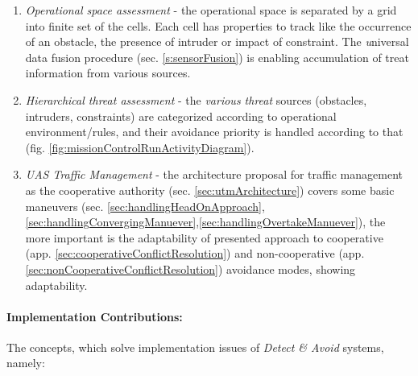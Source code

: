 \begin{enumerate}
    \item \emph{Operational space assessment} - the operational space is separated by a grid into finite set of the cells. Each cell has properties to track like the occurrence of an obstacle, the presence of intruder or impact of constraint. The \emph universal data fusion procedure (sec. \ref{s:sensorFusion}) is enabling accumulation of treat information from various sources.
    
    \item \emph{Hierarchical threat assessment} -  the \emph{various threat} sources (obstacles, intruders, constraints) are categorized according to operational environment/rules, and their avoidance priority is handled according to that (fig. \ref{fig:missionControlRunActivityDiagram}).
    
    \item \emph{UAS Traffic Management} - the architecture proposal for traffic management  as the cooperative authority (sec. \ref{sec:utmArchitecture}) covers some basic maneuvers (sec. \ref{sec:handlingHeadOnApproach}, \ref{sec:handlingConvergingManuever},\ref{sec:handlingOvertakeManuever}), the more important is the adaptability of presented approach to cooperative (app. \ref{sec:cooperativeConflictResolution}) and non-cooperative (app. \ref{sec:nonCooperativeConflictResolution}) avoidance modes, showing adaptability. 
\end{enumerate}

\paragraph{Implementation Contributions:} The concepts, which solve implementation issues of \emph{Detect \& Avoid} systems, namely:

